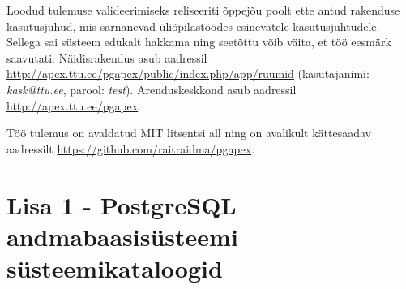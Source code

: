 \documentclass[a4paper,12pt]{article} %
\begin{document}
Loodud tulemuse valideerimiseks reliseeriti õppejõu poolt ette antud rakenduse kasutusjuhud, mis sarnanevad üliõpilastöödes esinevatele kasutusjuhtudele. Sellega sai süsteem edukalt hakkama ning seetõttu võib väita, et töö eesmärk saavutati. Näidisrakendus asub aadressil \url{http://apex.ttu.ee/pgapex/public/index.php/app/ruumid} (kasutajanimi: \textit{kask@ttu.ee}, parool: \textit{test}). Arenduskeskkond asub aadressil \url{http://apex.ttu.ee/pgapex}. \par

Töö tulemus on avaldatud MIT litsentsi all ning on avalikult kättesaadav aadressilt \newline \url{https://github.com/raitraidma/pgapex}.

\pagebreak




\pagebreak


\section*{Lisa 1 - PostgreSQL andmabaasisüsteemi süsteemikataloogid}
\label{lisa_postgresql_kataloogid}
\end{document}
